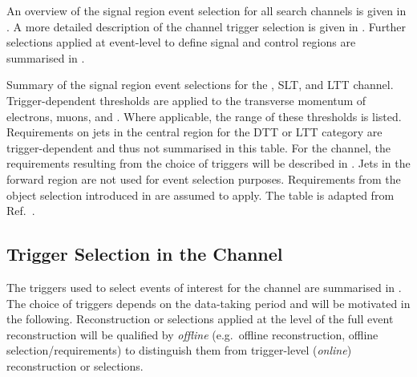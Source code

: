 An overview of the signal region event selection for all search channels is
given in . A more detailed description of the \hadhad
channel trigger selection is given in
. Further selections applied at event-level
to define signal and control regions are summarised in
.

\begin{table}[htbp]
  \centering

  \caption{Summary of the signal region event selections for the \hadhad,
    \lephad SLT, and \lephad LTT channel. Trigger-dependent thresholds are
    applied to the transverse momentum of electrons, muons, and
    \tauhadvis. Where applicable, the range of these thresholds is listed.
    Requirements on jets in the central region for the DTT or LTT category are
    trigger-dependent and thus not summarised in this table. For the \hadhad
    channel, the requirements resulting from the choice of triggers will be
    described in . Jets in the forward region
    are not used for event selection purposes. Requirements from the object
    selection introduced in  are assumed to
    apply. The table is adapted from Ref.~\cite{HDBS-2018-40}.}%
  \label{tab:event_selection}

  \resizebox{\textwidth}{!}{
    
  }
\end{table}


\subsection{Trigger Selection in the \hadhad Channel}%
\label{sec:trigger}%
\label{sec:hadhad_trigger_selection}

The triggers used to select events of interest for the \hadhad channel
are summarised in . The choice of triggers
depends on the data-taking period and will be motivated in the
following. Reconstruction or selections applied at the level of the
full event reconstruction will be qualified by \emph{offline} (e.g.\
offline reconstruction, offline selection/requirements) to distinguish
them from trigger-level (\emph{online}) reconstruction or selections.

